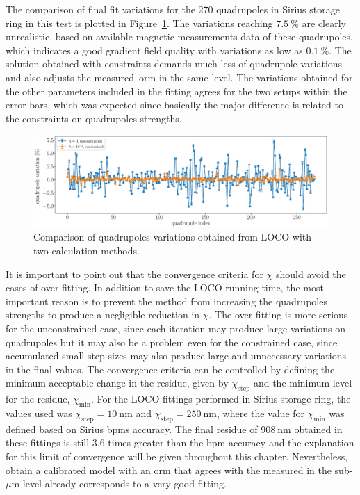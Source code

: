 The comparison of final fit variations for the 270 quadrupoles in Sirius storage ring in this test is plotted in Figure~\ref{fig:dkl_compare}. The variations reaching $\SI{7.5}{\%}$ are clearly unrealistic, based on available magnetic measurements data of these quadrupoles, which indicates a good gradient field quality with variations as low as $\SI{0.1}{\%}$. The solution obtained with constraints demands much less of quadrupole variations and also adjusts the measured~\gls{orm} in the same level. The variations obtained for the other parameters included in the fitting agrees for the two setups within the error bars, which was expected since basically the major difference is related to the constraints on quadrupoles strengths.
\begin{figure}
\centering
\includegraphics[width=1.0\textwidth]{figures/delta_kl_comparison_better.eps}
\caption{Comparison of quadrupoles variations obtained from LOCO with two calculation methods.}
\label{fig:dkl_compare}
\end{figure}

It is important to point out that the convergence criteria for $\chi$ should avoid the cases of over-fitting. In addition to save the LOCO running time, the most important reason is to prevent the method from increasing the quadrupoles strengths to produce a negligible reduction in $\chi$. The over-fitting is more serious for the unconstrained case, since each iteration may produce large variations on quadrupoles but it may also be a problem even for the constrained case, since accumulated small step sizes may also produce large and unnecessary variations in the final values. The convergence criteria can be controlled by defining the minimum acceptable change in the residue, given by $\chi_{\mathrm{step}}$ and the minimum level for the residue, $\chi_{\mathrm{min}}$. For the LOCO fittings performed in Sirius storage ring, the values used was $\chi_{\mathrm{step}} = \SI{10}{\nano\meter}$ and $\chi_{\mathrm{step}} = \SI{250}{\nano\meter}$, where the value for $\chi_{\mathrm{min}}$ was defined based on Sirius \glspl{bpm} accuracy. The final residue of $\SI{908}{\nano\meter}$ obtained in these fittings is still $3.6$ times greater than the \gls{bpm} accuracy and the explanation for this limit of convergence will be given throughout this chapter. Nevertheless, obtain a calibrated model with an \gls{orm} that agrees with the measured in the sub-$\mu$m level already corresponds to a very good fitting.

